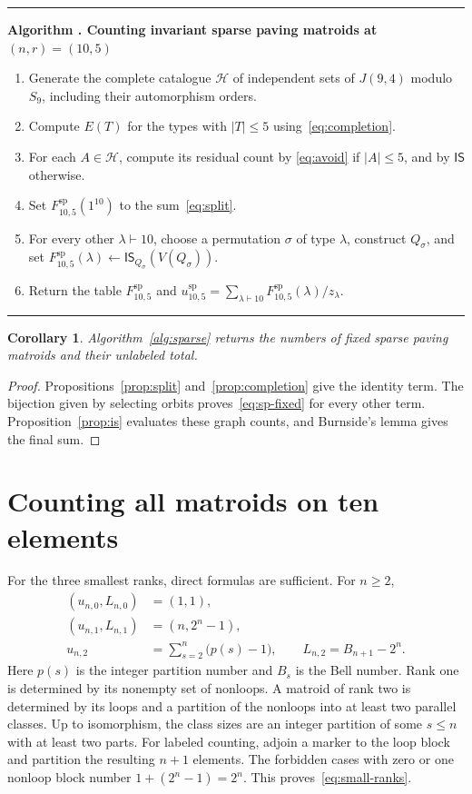 \documentclass[11pt]{article}
\newtheorem{corollary}[theorem]{Corollary}
\theoremstyle{definition}
\newcounter{algorithm}
\newenvironment{algorithm}[1]{%
  \refstepcounter{algorithm}\par\medskip\noindent
  \begin{minipage}{\linewidth}\hrule\medskip
  \textbf{Algorithm \thealgorithm. #1}\par\smallskip
  \begin{enumerate}[label=\arabic*.,leftmargin=2.2em,itemsep=2pt,topsep=0pt]
}{\end{enumerate}\medskip\hrule\end{minipage}\par\medskip}
\newcommand{\SP}{\mathrm{sp}}
\newcommand{\IS}{\mathsf{IS}}
\begin{document}
\begin{algorithm}{Counting invariant sparse paving matroids at $(n,r)=(10,5)$}
\label{alg:sparse}
\item Generate the complete catalogue $\mathcal H$ of independent sets of
      $J(9,4)$ modulo $S_9$, including their automorphism orders.
\item Compute $E(T)$ for the types with $|T|\le5$
      using~\eqref{eq:completion}.
\item For each $A\in\mathcal H$, compute its residual count by
      \eqref{eq:avoid} if $|A|\le5$, and by $\IS$ otherwise.
\item Set $F^{\SP}_{10,5}(1^{10})$ to the sum~\eqref{eq:split}.
\item For every other $\lambda\vdash10$, choose a permutation $\sigma$ of
      type $\lambda$, construct $Q_\sigma$, and set
      $F^{\SP}_{10,5}(\lambda)\gets\IS_{Q_\sigma}(V(Q_\sigma))$.
\item Return the table $F^{\SP}_{10,5}$ and
      $u^{\SP}_{10,5}=\sum_{\lambda\vdash10}F^{\SP}_{10,5}(\lambda)/z_\lambda$.
\end{algorithm}

\begin{corollary}\label{cor:sparse}
Algorithm~\ref{alg:sparse} returns the numbers of fixed sparse paving
matroids and their unlabeled total.
\end{corollary}
\begin{proof}
Propositions~\ref{prop:split} and~\ref{prop:completion} give the identity
term. The bijection given by selecting orbits proves~\eqref{eq:sp-fixed} for every
other term. Proposition~\ref{prop:is} evaluates these graph counts, and
Burnside's lemma gives the final sum.
\end{proof}

\section{Counting all matroids on ten elements}

For the three smallest ranks, direct formulas are sufficient. For $n\ge2$,
\begin{align}
(u_{n,0},L_{n,0})&=(1,1),\nonumber\\
(u_{n,1},L_{n,1})&=(n,2^n-1),\label{eq:small-ranks}\\
u_{n,2}&=\sum_{s=2}^n\bigl(p(s)-1\bigr),\qquad
L_{n,2}=B_{n+1}-2^n.\nonumber
\end{align}
Here $p(s)$ is the integer partition number and $B_s$ is the Bell number.
Rank one is determined by its nonempty set of nonloops. A matroid of rank two
is determined by its loops and a partition of the nonloops into at least
two parallel classes. Up to isomorphism, the class sizes are an integer
partition of some $s\le n$ with at least two parts. For labeled counting,
adjoin a marker to the loop block and partition the resulting $n+1$
elements. The forbidden cases with zero or one nonloop block number
$1+(2^n-1)=2^n$. This proves~\eqref{eq:small-ranks}.
\end{document}
